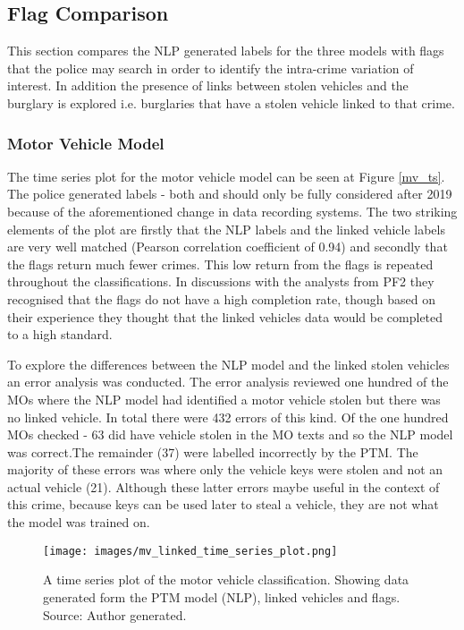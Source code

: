 

\subsection{Flag Comparison} This section compares the NLP generated labels for the three models with flags that the police may search in order to identify the intra-crime variation of interest. In addition the presence of links between stolen vehicles and the burglary is explored i.e. burglaries that have a stolen vehicle linked to that crime.

\subsubsection{Motor Vehicle Model} The time series plot for the motor vehicle model can be seen at Figure \ref{mv_ts}. The police generated labels - both  and  should only be fully considered after 2019 because of the aforementioned change in data recording systems. The two striking elements of the plot are firstly that the NLP labels and the linked vehicle labels are very well matched (Pearson correlation coefficient of 0.94) and secondly that the flags return much fewer crimes. This low return from the flags is repeated throughout the classifications. In discussions with the analysts from PF2 they recognised that the flags do not have a high completion rate, though based on their experience they thought that the linked vehicles data would be completed to a high standard. 

To explore the differences between the NLP model and the linked stolen vehicles an error analysis was conducted. The error analysis reviewed one hundred of the MOs where the NLP model had identified a motor vehicle stolen but there was no linked vehicle. In total there were 432 errors of this kind. Of the one hundred MOs checked - 63 did have vehicle stolen in the MO texts and so the NLP model was correct.The remainder (37) were labelled incorrectly by the PTM. The majority of these errors was where only the vehicle keys were stolen and not an actual vehicle (21). Although these latter errors maybe useful in the context of this crime, because keys can be used later to steal a vehicle,  they are not what the model was trained on.   


\begin{figure}
  \texttt{[image: images/mv\_linked\_time\_series\_plot.png]}
  \caption[Motor vehicle model time series plot]{A time series plot of the motor vehicle classification. Showing data generated form the PTM model (NLP), linked vehicles and flags. Source: Author generated.}
  \label{fig:mv_ts}
\end{figure}

